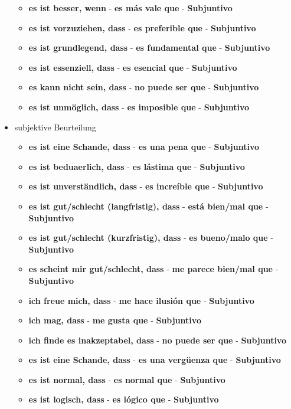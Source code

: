 \documentclass{article}
\begin{document}
\begin{multicols}{2}
\begin{itemize}
\begin{itemize}
			\item{\textbf{es ist besser, wenn} - \textbf{es más vale que} - \textbf{Subjuntivo}}
			\item{\textbf{es ist vorzuziehen, dass} - \textbf{es preferible que} - \textbf{Subjuntivo}}
			\item{\textbf{es ist grundlegend, dass} - \textbf{es fundamental que} - \textbf{Subjuntivo}}
			\item{\textbf{es ist essenziell, dass} - \textbf{es esencial que} - \textbf{Subjuntivo}}
			\item{\textbf{es kann nicht sein, dass} - \textbf{no puede ser que} - \textbf{Subjuntivo}}
			\item{\textbf{es ist unmöglich, dass} - \textbf{es imposible que} - \textbf{Subjuntivo}}
		\end{itemize}
		\item{subjektive Beurteilung}
		\begin{itemize}
			\item{\textbf{es ist eine Schande, dass} - \textbf{es una pena que} - \textbf{Subjuntivo}}
			\item{\textbf{es ist beduaerlich, dass} - \textbf{es lástima que} - \textbf{Subjuntivo}}
			\item{\textbf{es ist unverständlich, dass} - \textbf{es increíble que} - \textbf{Subjuntivo}}
			\item{\textbf{es ist gut/schlecht (langfristig), dass} - \textbf{está bien/mal que} - \textbf{Subjuntivo}}
			\item{\textbf{es ist gut/schlecht (kurzfristig), dass} - \textbf{es bueno/malo que} - \textbf{Subjuntivo}}
			\item{\textbf{es scheint mir gut/schlecht, dass} - \textbf{me parece bien/mal que} - \textbf{Subjuntivo}}
			\item{\textbf{ich freue mich, dass} - \textbf{me hace ilusión que} - \textbf{Subjuntivo}}
			\item{\textbf{ich mag, dass} - \textbf{me gusta que} - \textbf{Subjuntivo}}
			\item{\textbf{ich finde es inakzeptabel, dass} - \textbf{no puede ser que} - \textbf{Subjuntivo}}
			\item{\textbf{es ist eine Schande, dass} - \textbf{es una vergüenza que} - \textbf{Subjuntivo}}
			\item{\textbf{es ist normal, dass} - \textbf{es normal que} - \textbf{Subjuntivo}}
			\item{\textbf{es ist logisch, dass} - \textbf{es lógico que} - \textbf{Subjuntivo}}

\end{itemize}
\end{itemize}
\end{multicols}
\end{document}

